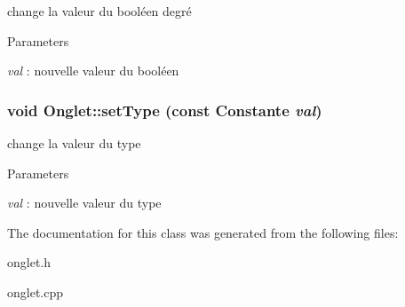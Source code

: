 change la valeur du booléen degré 


\begin{DoxyParams}{Parameters}
\item[{\em val}]: nouvelle valeur du booléen \end{DoxyParams}
\hypertarget{classOnglet_aefe162f23f7d169c8a46daa08dfc0ccb}{
\subsubsection[{setType}]{\setlength{\rightskip}{0pt plus 5cm}void Onglet::setType (const Constante {\em val})}}
\label{classOnglet_aefe162f23f7d169c8a46daa08dfc0ccb}


change la valeur du type 


\begin{DoxyParams}{Parameters}
\item[{\em val}]: nouvelle valeur du type \end{DoxyParams}


The documentation for this class was generated from the following files:\begin{DoxyCompactItemize}
\item 
onglet.h\item 
onglet.cpp\end{DoxyCompactItemize}

